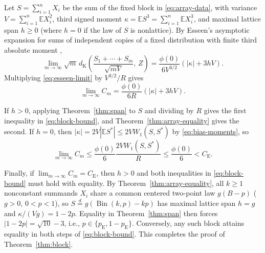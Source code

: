 \documentclass[11pt]{article}
\numberwithin{equation}{section}
\theoremstyle{remark}
\DeclareMathOperator{\Bin}{Bin}
\newcommand{\E}{\mathbb E}
\newcommand{\ce}{C_{\mathrm E}}
\newcommand{\phz}{\phi(0)}
\begin{document}
Let $S=\sum_{i=1}^nX_i$ be the sum of the fixed block in \eqref{eq:array-data},
with variance $V=\sum_{i=1}^n\E X_i^2$, third signed moment
$\kappa=\E S^3=\sum_{i=1}^n\E X_i^3$, and maximal lattice span $h\ge0$ (where
$h=0$ if the law of $S$ is nonlattice). By Esseen's asymptotic expansion for
sums of independent copies of a fixed distribution with finite third absolute
moment \citep[pp.~160--162, eqs.~(6)--(7)]{Esseen1956},
\begin{equation}\label{eq:esseen-limit}
 \lim_{m\to\infty}\sqrt m\,
 d_{\mathrm K}\!\left(\frac{S_1+\cdots+S_m}{\sqrt{mV}},\,Z\right)
                  =\frac{\phz}{6V^{3/2}}(|\kappa|+3hV).
\end{equation}
Multiplying \eqref{eq:esseen-limit} by $V^{3/2}/R$ gives
\begin{equation}\label{eq:original-price-limit}
                    \lim_{m\to\infty}C_m
                      =\frac{\phz}{6R}(|\kappa|+3hV).
\end{equation}

If $h>0$, applying Theorem~\ref{thm:span} to $S$ and dividing by $R$ gives
the first inequality in \eqref{eq:block-bound}, and Theorem~\ref{thm:array-equality}
gives the second. If $h=0$, then $|\kappa|=2V|\E S^*|\le2VW_1(S,S^*)$ by
\eqref{eq:bias-moments}, so
\[
             \lim_{m\to\infty}C_m
             \le\frac{\phz}{6}\frac{2V W_1(S,S^*)}{R}
             \le\frac{\phz}{6}<\ce.
\]

Finally, if $\lim_{m\to\infty}C_m=\ce$, then $h>0$ and both inequalities in
\eqref{eq:block-bound} must hold with equality. By Theorem~\ref{thm:array-equality},
all $k\ge1$ nonconstant summands $X_i$ share a common centered two-point law
$g(B-p)$ ($g>0$, $0<p<1$), so $S\stackrel d=g(\Bin(k,p)-kp)$ has maximal
lattice span $h=g$ and $\kappa/(Vg)=1-2p$. Equality in Theorem~\ref{thm:span}
then forces $|1-2p|=\sqrt{10}-3$, i.e., $p\in\{p_{\mathrm E},1-p_{\mathrm E}\}$.
Conversely, any such block attains equality in both steps of
\eqref{eq:block-bound}. This completes the proof of Theorem~\ref{thm:block}.



\end{document}

